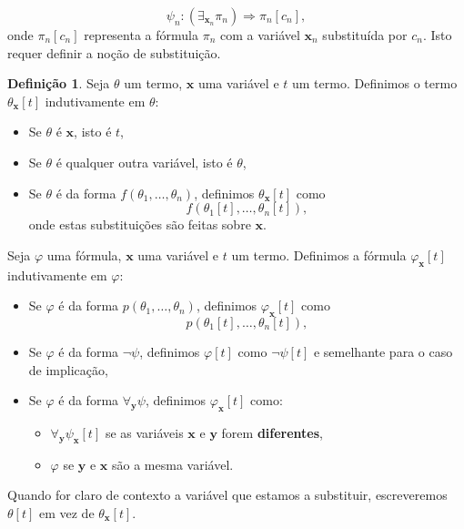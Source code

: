 \documentclass{report}
\theoremstyle{definition}
\newtheorem{definicao}{Definição}
\theoremstyle{remark}
\renewcommand{\bf}[1]{\mathbf{#1}}
\newcommand{\imply}{\mathbin{\Rightarrow}}
\begin{document}
	\[\psi_n : (\exists_{\bf x_n} \pi_n) \imply \pi_n[c_n],\]
	onde $\pi_n[c_n]$ representa a fórmula $\pi_n$ com a variável $\bf x_n$ substituída por $c_n$. Isto requer definir a noção de substituição.
	
	\begin{definicao}
	Seja $\theta$ um termo, $\bf x$ uma variável e $t$ um termo. Definimos o termo $\theta_{\bf x}[t]$ indutivamente em $\theta$:
	
	\begin{itemize}
	\item Se $\theta$ é $\bf x$, isto é $t$,
	
	\item Se $\theta$ é qualquer outra variável, isto é $\theta$,
	
	\item Se $\theta$ é da forma $f(\theta_1, \dots, \theta_n)$, definimos $\theta_{\bf x}[t]$ como
	\[f(\theta_1[t], \dots, \theta_n[t]),\]
	onde estas substituições são feitas sobre $\bf x$.
	\end{itemize}
	
	Seja $\varphi$ uma fórmula, $\bf x$ uma variável e $t$ um termo. Definimos a fórmula $\varphi_{\bf x}[t]$ indutivamente em $\varphi$:
	
	\begin{itemize}
	\item Se $\varphi$ é da forma $p(\theta_1, \dots, \theta_n)$, definimos $\varphi_{\bf x}[t]$ como
	\[p(\theta_1[t], \dots, \theta_n[t]),\]
	
	\item Se $\varphi$ é da forma $\neg \psi$, definimos $\varphi[t]$ como $\neg \psi[t]$ e semelhante para o caso de implicação,
	
	\item Se $\varphi$ é da forma $\forall_{\bf y} \psi$, definimos $\varphi_{\bf x}[t]$ como:
	
	\begin{itemize}
	\item $\forall_{\bf y} \psi_{\bf x}[t]$ se as variáveis $\bf x$ e $\bf y$ forem \textbf{diferentes},
	
	\item $\varphi$ se $\bf y$ e $\bf x$ são a mesma variável.
	\end{itemize}
	\end{itemize}

	Quando for claro de contexto a variável que estamos a substituir, escreveremos $\theta[t]$ em vez de $\theta_{\bf x}[t]$.
	\end{definicao}
	
\end{document}
